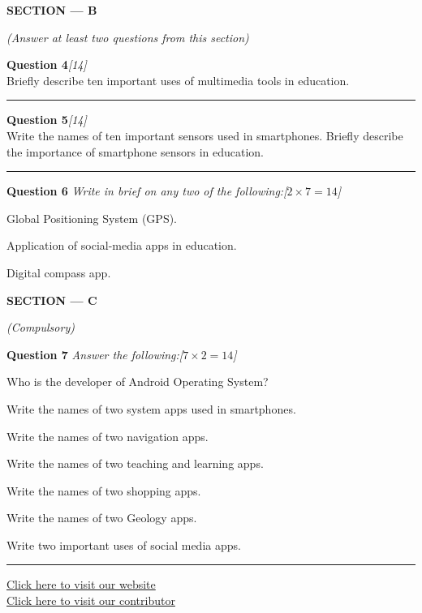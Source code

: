 \documentclass[11pt,a4paper]{article}
\newcommand{\pts}[1]{\hfill   \textit{[#1]}}
\begin{document}
\bigskip

\begin{center}
   \textbf{\large SECTION --- B}
\end{center}
   \textit{(Answer at least two questions from this section)}
\bigskip




\noindent   \textbf{Question 4}\pts{14} \\
Briefly describe ten important uses of multimedia tools in education.

\medskip\rule{\linewidth}{0.2pt}\medskip




\noindent   \textbf{Question 5}\pts{14} \\
Write the names of ten important sensors used in smartphones. Briefly describe the importance of smartphone sensors in education.

\medskip\rule{\linewidth}{0.2pt}\medskip




\noindent   \textbf{Question 6}   \textit{Write in brief on any two of the following:}\pts{$2  \times 7 = 14$}

\begin{parts}[label=(\roman*)]
  \item Global Positioning System (GPS).
  \item Application of social-media apps in education.
  \item Digital compass app.
\end{parts}

\bigskip

\begin{center}
   \textbf{\large SECTION --- C}
\end{center}
   \textit{(Compulsory)}
\bigskip




\noindent   \textbf{Question 7}   \textit{Answer the following:}\pts{$7  \times 2 = 14$}

\begin{parts}[label=(\roman*)]
  \item Who is the developer of Android Operating System?
  \item Write the names of two system apps used in smartphones.
  \item Write the names of two navigation apps.
  \item Write the names of two teaching and learning apps.
  \item Write the names of two shopping apps.
  \item Write the names of two Geology apps.
  \item Write two important uses of social media apps.
\end{parts}

\vfill\rule{\linewidth}{0.4pt}

\begin{center}\small
\href{https://bhu-exam.vercel.app/}{Click here to visit our website}\\[4pt]
\href{https://me-aryan.vercel.app/}{Click here to visit our contributor}
\end{center}
\end{document}
